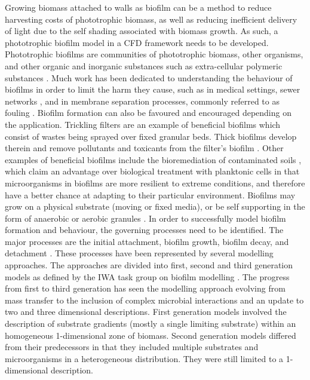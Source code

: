 Growing biomass attached to walls as biofilm can be a method to reduce harvesting costs of phototrophic biomass, as well as reducing inefficient delivery of light due to the self shading associated with biomass growth. As such, a phototrophic biofilm model in a CFD framework needs to be developed. 
\skippingparagraph
Phototrophic biofilms are communities of phototrophic biomass, other organisms, and other organic and inorganic substances such as extra-cellular polymeric substances \cite{vanloosdrecht2002}. 
Much work has been dedicated to understanding the behaviour of biofilms in order to limit the harm they cause, such as in medical settings, sewer networks \cite{pikaar2014}, and in membrane separation processes, commonly referred to as fouling \cite{radaei2018}. Biofilm formation can also be favoured and encouraged depending on the application. 
Trickling filters are an example of beneficial biofilms which consist of wastes being sprayed over fixed granular beds. Thick biofilms develop therein and remove pollutants and toxicants from the filter's biofilm \cite{donlan2002}. Other examples of beneficial biofilms include the bioremediation of contaminated soils \cite{singh2006}, which claim an advantage over biological treatment with planktonic cells in that microorganisms in biofilms are more resilient to extreme conditions, and therefore have a better chance at adapting to their particular environment. Biofilms may grow on a physical substrate (moving or fixed media), or be self supporting in the form of anaerobic or aerobic granules \cite{baeten2018}. 
\skippingparagraph
In order to successfully model biofilm formation and behaviour, the governing processes need to be identified. The major processes are the initial attachment, biofilm growth, biofilm decay, and detachment \cite{alpkvist2007}. 
These processes have been represented by several modelling approaches. The approaches are divided into first, second and third generation models as defined by the IWA task group on biofilm modelling \cite{wanner2006}. 
The progress from first to third generation has seen the modelling approach evolving from mass transfer to the inclusion of complex microbial interactions and an update to two and three dimensional descriptions. First generation models involved the description of substrate gradients (mostly a single limiting substrate) within an homogeneous 1-dimensional zone of biomass. Second generation models differed from their predecessors in that they included multiple substrates and microorganisms in a heterogeneous distribution. They were still limited to a 1-dimensional description. 

